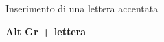 \begin{frame}{Inserimento di una lettera accentata}

\vfill
\centerline{\textbf{\Huge{Alt Gr + lettera}}}
\vfill

\end{frame}